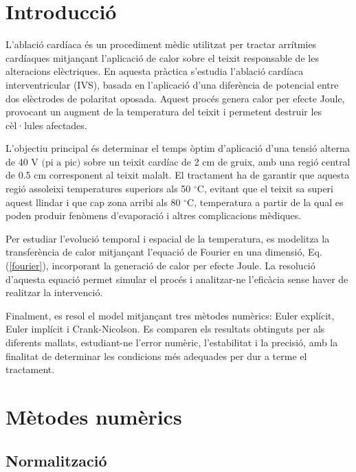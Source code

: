 \documentclass[a4paper,12pt,oneside]{article}
\begin{document}
\newpage

\tableofcontents

\newpage

\section{Introducció}

L'ablació cardíaca és un procediment mèdic utilitzat per tractar arrítmies cardíaques mitjançant l'aplicació de calor sobre el 
teixit responsable de les alteracions elèctriques. En aquesta pràctica s'estudia l'ablació cardíaca interventricular (IVS), 
basada en l'aplicació d'una diferència de potencial entre dos elèctrodes de polaritat oposada. Aquest procés genera calor per 
efecte Joule, provocant un augment de la temperatura del teixit i permetent destruir les cèl·lules afectades.

L'objectiu principal és determinar el temps òptim d'aplicació d'una tensió alterna de 40 V $\text{(pi a pic)}$ sobre un teixit 
cardíac de 2 cm de gruix, amb una regió central de 0.5 cm corresponent al teixit malalt. El tractament ha de garantir que aquesta 
regió assoleixi temperatures superiors als 50 $^\circ$C, evitant que el teixit sa superi aquest llindar i que cap zona arribi als 80 $^\circ$C, 
temperatura a partir de la qual es poden produir fenòmens d'evaporació i altres complicacions mèdiques.

Per estudiar l'evolució temporal i espacial de la temperatura, es modelitza la transferència de calor mitjançant l'equació de 
Fourier en una dimensió, Eq. (\ref{fourier}), incorporant la generació de calor per efecte Joule. La resolució d'aquesta equació permet 
simular el procés i analitzar-ne l'eficàcia sense haver de realitzar la intervenció. 

Finalment, es resol el model mitjançant tres mètodes numèrics: Euler explícit, Euler implícit i Crank-Nicolson. Es comparen els 
resultats obtinguts per als diferents mallats, estudiant-ne l'error numèric, l'estabilitat i la precisió, amb la finalitat de 
determinar les condicions més adequades per dur a terme el tractament.

\section{Mètodes numèrics}

\subsection{Normalització}
\end{document}
